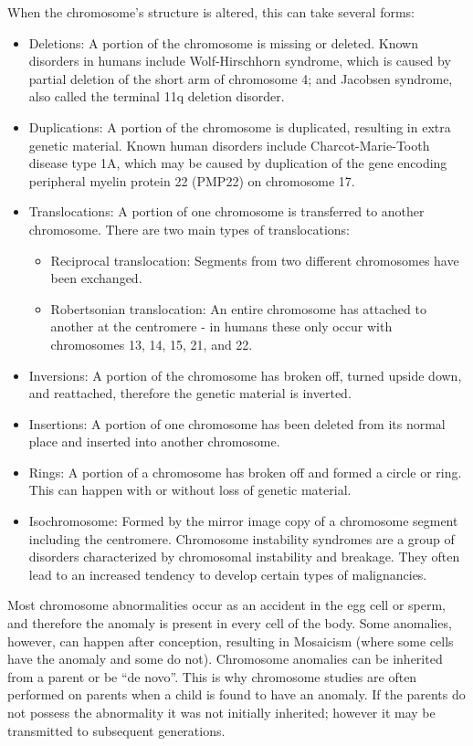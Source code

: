 When the chromosome's structure is altered, this can take several forms:

\begin{itemize}
\tightlist
\item
  Deletions: A portion of the chromosome is missing or deleted. Known disorders in humans include Wolf-Hirschhorn syndrome, which is caused by partial deletion of the short arm of chromosome 4; and Jacobsen syndrome, also called the terminal 11q deletion disorder.
\item
  Duplications: A portion of the chromosome is duplicated, resulting in extra genetic material. Known human disorders include Charcot-Marie-Tooth disease type 1A, which may be caused by duplication of the gene encoding peripheral myelin protein 22 (PMP22) on chromosome 17.
\item
  Translocations: A portion of one chromosome is transferred to another chromosome. There are two main types of translocations:

  \begin{itemize}
  \tightlist
  \item
    Reciprocal translocation: Segments from two different chromosomes have been exchanged.
  \item
    Robertsonian translocation: An entire chromosome has attached to another at the centromere - in humans these only occur with chromosomes 13, 14, 15, 21, and 22.
  \end{itemize}
\item
  Inversions: A portion of the chromosome has broken off, turned upside down, and reattached, therefore the genetic material is inverted.
\item
  Insertions: A portion of one chromosome has been deleted from its normal place and inserted into another chromosome.
\item
  Rings: A portion of a chromosome has broken off and formed a circle or ring. This can happen with or without loss of genetic material.
\item
  Isochromosome: Formed by the mirror image copy of a chromosome segment including the centromere.
  Chromosome instability syndromes are a group of disorders characterized by chromosomal instability and breakage. They often lead to an increased tendency to develop certain types of malignancies.
\end{itemize}

Most chromosome abnormalities occur as an accident in the egg cell or sperm, and therefore the anomaly is present in every cell of the body. Some anomalies, however, can happen after conception, resulting in Mosaicism (where some cells have the anomaly and some do not). Chromosome anomalies can be inherited from a parent or be ``de novo''. This is why chromosome studies are often performed on parents when a child is found to have an anomaly. If the parents do not possess the abnormality it was not initially inherited; however it may be transmitted to subsequent generations.

